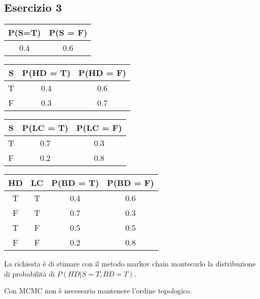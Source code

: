 \documentclass{article}
\begin{document}
\subsection{Esercizio 3}
\begin{center}
\end{center}
\begin{tabular}{|c|c|}
	\hline
	P(S=T) & P(S = F) \\ \hline
	0.4    & 0.6      \\ \hline
\end{tabular}
\begin{tabular}{|c|c|c|}
	\hline
	S & P(HD = T) & P(HD = F) \\ \hline
	T & 0.4       & 0.6       \\ \hline
	F & 0.3       & 0.7       \\ \hline
\end{tabular}
\begin{tabular}{|c|c|c|}
	\hline
	S & P(LC = T) & P(LC = F) \\ \hline
	T & 0.7       & 0.3       \\ \hline
	F & 0.2       & 0.8       \\ \hline
\end{tabular}
\begin{tabular}{|c|c|c|c|}
	\hline
	HD & LC & P(BD = T) & P(BD = F) \\ \hline
	T  & T  & 0.4       & 0.6       \\ \hline
	F  & T  & 0.7       & 0.3       \\ \hline
	T  & F  & 0.5       & 0.5       \\ \hline
	F  & F  & 0.2       & 0.8       \\ \hline
\end{tabular}


La richiesta è di stimare con il metodo markov chain montecarlo la distribuzione di probabilità di \(P(HD | S = T, BD = T )\).

Con MCMC non è necessario mantenere l'ordine topologico.
\end{document}
